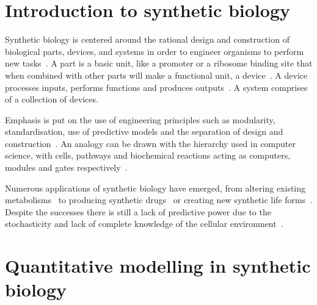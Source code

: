 

\section{Introduction to synthetic biology}

Synthetic biology is centered around the rational design and construction of biological parts, devices, and systems in order to engineer organisms to perform new tasks~\autocite{Lu:2009ez, Andrianantoandro:2006bia}. A part is a basic unit, like a promoter or a ribosome binding site that when combined with other parts will make a functional unit, a device~\autocite{Heinemann:2006ht}. A device processes inputs, performs functions and produces outputs~\autocite{Andrianantoandro:2006bia}. A system comprises of a collection of devices.     

Emphasis is put on the use of engineering principles such as modularity, standardisation, use of predictive models and the separation of design and construction~\autocite{Agapakis:2009bt, Heinemann:2006ht}. An analogy can be drawn with the hierarchy used in computer science, with cells, pathways and biochemical reactions acting as computers, modules and gates respectively~\autocite{Andrianantoandro:2006bia}. 
       
Numerous applications of synthetic biology have emerged, from altering existing metabolisms~\autocite{Wang:2007kh} to producing synthetic drugs~\autocite{Ro:2006cl} or creating new synthetic life forms~\autocite{Hutchison:2016gg}. Despite the successes there is still a lack of predictive power due to the stochasticity and lack of complete knowledge of the cellular environment~\autocite{Andrianantoandro:2006bia}.



\section{Quantitative modelling in synthetic biology}




